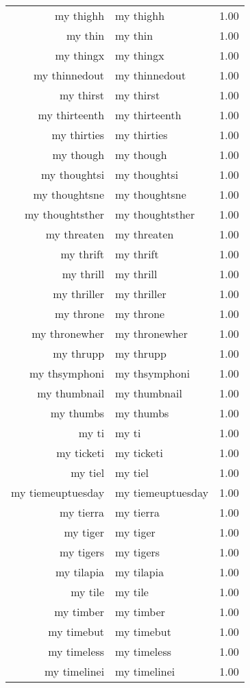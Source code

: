 \begin{table}[ht]
\begin{tabular}{rlr}
  my thighh & my thighh & 1.00 \\ 
  my thin & my thin & 1.00 \\ 
  my thingx & my thingx & 1.00 \\ 
  my thinnedout & my thinnedout & 1.00 \\ 
  my thirst & my thirst & 1.00 \\ 
  my thirteenth & my thirteenth & 1.00 \\ 
  my thirties & my thirties & 1.00 \\ 
  my though & my though & 1.00 \\ 
  my thoughtsi & my thoughtsi & 1.00 \\ 
  my thoughtsne & my thoughtsne & 1.00 \\ 
  my thoughtsther & my thoughtsther & 1.00 \\ 
  my threaten & my threaten & 1.00 \\ 
  my thrift & my thrift & 1.00 \\ 
  my thrill & my thrill & 1.00 \\ 
  my thriller & my thriller & 1.00 \\ 
  my throne & my throne & 1.00 \\ 
  my thronewher & my thronewher & 1.00 \\ 
  my thrupp & my thrupp & 1.00 \\ 
  my thsymphoni & my thsymphoni & 1.00 \\ 
  my thumbnail & my thumbnail & 1.00 \\ 
  my thumbs & my thumbs & 1.00 \\ 
  my ti & my ti & 1.00 \\ 
  my ticketi & my ticketi & 1.00 \\ 
  my tiel & my tiel & 1.00 \\ 
  my tiemeuptuesday & my tiemeuptuesday & 1.00 \\ 
  my tierra & my tierra & 1.00 \\ 
  my tiger & my tiger & 1.00 \\ 
  my tigers & my tigers & 1.00 \\ 
  my tilapia & my tilapia & 1.00 \\ 
  my tile & my tile & 1.00 \\ 
  my timber & my timber & 1.00 \\ 
  my timebut & my timebut & 1.00 \\ 
  my timeless & my timeless & 1.00 \\ 
  my timelinei & my timelinei & 1.00 \\ 

\end{tabular}
\end{table}
